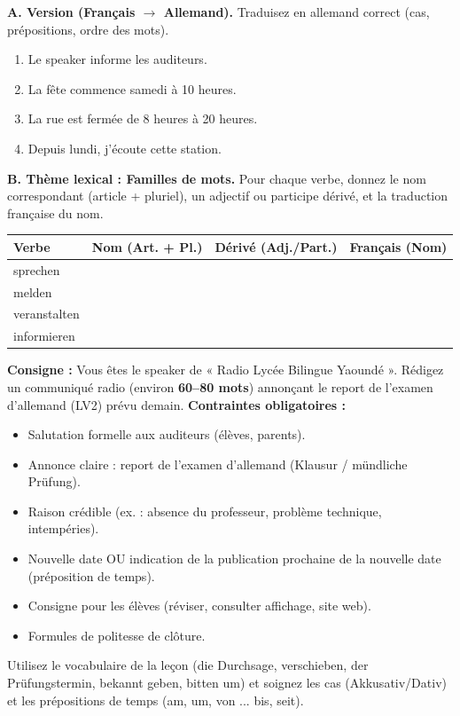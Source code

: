 \documentclass[11pt]{article}
\newcommand{\cle}[1]{{\popxbold\color{popdark}#1}}
\begin{document}
\begin{exercice}
\textbf{A. Version (Français $\rightarrow$ Allemand).} Traduisez en allemand correct (cas, prépositions, ordre des mots).
\begin{enumerate}
\item Le speaker informe les auditeurs.
\item La fête commence samedi à 10 heures.
\item La rue est fermée de 8 heures à 20 heures.
\item Depuis lundi, j'écoute cette station.
\end{enumerate}
\textbf{B. Thème lexical : Familles de mots.}
Pour chaque verbe, donnez le nom correspondant (article + pluriel), un adjectif ou participe dérivé, et la traduction française du nom.
\begin{center}
\begin{tabularx}{\linewidth}{|X|X|X|X|}
\hline
\rowcolor{popblueL} \textbf{Verbe} & \textbf{Nom (Art. + Pl.)} & \textbf{Dérivé (Adj./Part.)} & \textbf{Français (Nom)} \\ \hline
sprechen &  &  &  \\ \hline
melden &  &  &  \\ \hline
veranstalten &  &  &  \\ \hline
informieren &  &  &  \\ \hline
\end{tabularx}
\end{center}
\end{exercice}

\begin{exercice}
\textbf{Consigne :} Vous êtes le speaker de « Radio Lycée Bilingue Yaoundé ». Rédigez un communiqué radio (environ \textbf{60--80 mots}) annonçant le report de l'examen d'allemand (LV2) prévu demain.
\textbf{Contraintes obligatoires :}
\begin{itemize}
\item Salutation formelle aux auditeurs (élèves, parents).
\item Annonce claire : report de l'examen d'allemand (Klausur / mündliche Prüfung).
\item Raison crédible (ex. : absence du professeur, problème technique, intempéries).
\item Nouvelle date OU indication de la publication prochaine de la nouvelle date (préposition de temps).
\item Consigne pour les élèves (réviser, consulter affichage, site web).
\item Formules de politesse de clôture.
\end{itemize}
Utilisez le vocabulaire de la leçon (\cle{die Durchsage}, \cle{verschieben}, \cle{der Prüfungstermin}, \cle{bekannt geben}, \cle{bitten um}) et soignez les cas (Akkusativ/Dativ) et les prépositions de temps (\cle{am}, \cle{um}, \cle{von ... bis}, \cle{seit}).
\end{exercice}
\end{document}
